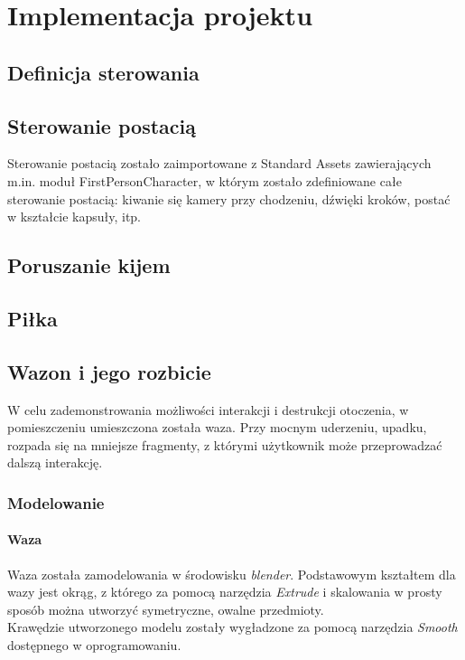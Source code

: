 \section{Implementacja projektu}

\subsection{Definicja sterowania}

\subsection{Sterowanie postacią}
Sterowanie postacią zostało zaimportowane z Standard Assets zawierających m.in. moduł FirstPersonCharacter, w którym zostało zdefiniowane całe sterowanie postacią: kiwanie się kamery przy chodzeniu, dźwięki kroków, postać w kształcie kapsuły, itp.

\subsection{Poruszanie kijem}

\subsection{Piłka}

\subsection{Wazon i jego rozbicie}
W celu zademonstrowania możliwości interakcji i destrukcji otoczenia, w pomieszczeniu umieszczona została waza. Przy mocnym uderzeniu, upadku, rozpada się na mniejsze fragmenty, z którymi użytkownik może przeprowadzać dalszą interakcję.

\subsubsection{Modelowanie}
\paragraph{Waza}
Waza została zamodelowania w środowisku \textit{blender}. Podstawowym kształtem dla wazy jest okrąg, z którego za pomocą narzędzia \textit{Extrude} i skalowania w prosty sposób można utworzyć symetryczne, owalne przedmioty. \\
Krawędzie utworzonego modelu zostały wygładzone za pomocą narzędzia \textit{Smooth} dostępnego w oprogramowaniu. 
